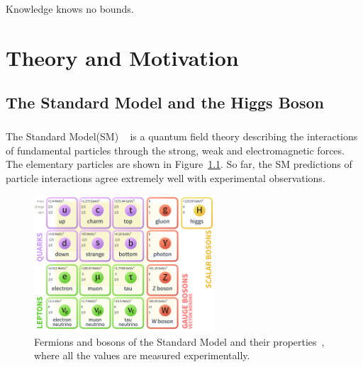 \begin{savequote}[75mm]
Knowledge knows no bounds.
\end{savequote}

\chapter{Theory and Motivation}

\section{The Standard Model and the Higgs Boson}
\paragraph{}
The Standard Model(SM) ~\cite{Pdg,Griffiths,Tully,Schwartz} is a quantum field theory describing the interactions of fundamental particles through the strong, weak and electromagnetic forces. The elementary particles are shown in Figure~\ref{fig:SM}. So far, the SM predictions of particle interactions agree extremely well with experimental observations.

\begin{figure}[h!]
  \centering
  \captionsetup{justification=centering}
  \includegraphics[width=0.6\textwidth]{figures/theory/SM}
  \caption{Fermions and bosons of the Standard Model and their properties~\cite{Pdg}, where all the values are measured experimentally.}
  \label{fig:SM}
\end{figure}


